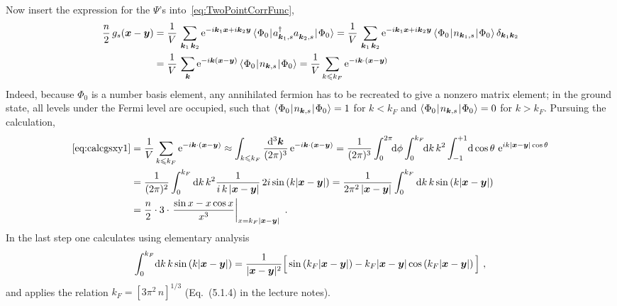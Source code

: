 \documentclass[11pt,a4paper]{article}
\newcommand{\ee}{{\mathrm{e}}}
\newcommand{\abs}[1]{\lvert#1\rvert}
\newcommand{\matrixel}[3]{\langle\hspace{0.15mm}#1\hspace{0.25mm}\vert\hspace{0.25mm} #2 \hspace{0.25mm}\vert\hspace{0.25mm}#3\hspace{0.15mm}\rangle}
\newcommand{\boldx}{{\boldsymbol x}}
\newcommand{\boldy}{{\boldsymbol y}}
\newcommand{\boldk}{{\boldsymbol k}}
\begin{document}
\begin{exenumerate}
\begin{loesung}
    Now insert the expression for the $\Psi$'s into~\eqref{eq:TwoPointCorrFunc},
    \begin{align}
      \frac{n}{2}\,g_s(\boldx-\boldy)
      &= \frac{1}{V}\,\sum_{\boldk_1\,\boldk_2} \ee^{-i\boldk_1\boldx + i\boldk_2\boldy} \,
      \matrixel{\Phi_0}{a^\dagger_{\boldk_1,s} a^{\vphantom{\dagger}}_{\boldk_2,s}}{\Phi_0}
      = \frac{1}{V}\,\sum_{\boldk_1\,\boldk_2} \ee^{-i\boldk_1\boldx + i\boldk_2\boldy} \,
      \matrixel{\Phi_0}{n_{\boldk_1,s}}{\Phi_0}\,\delta_{\boldk_1\boldk_2}\nonumber\\
      &= \frac{1}{V}\,\sum_{\boldk} \ee^{-i\boldk\left(\boldx-\boldy\right)} \,
      \matrixel{\Phi_0}{n_{\boldk,s}}{\Phi_0}
      = \frac{1}{V} \sum_{k\leqslant k_F} \ee^{-i\boldk\cdot\left(\boldx-\boldy\right)}
      \label{eq:calcgsxy1}
    \end{align}
    Indeed, because $\Phi_0$ is a number basis element, any annihilated fermion has to be recreated to give a nonzero
    matrix element; in the ground state, all levels under the Fermi level are occupied, such that
    $\matrixel{\Phi_0}{n_{\boldk,s}}{\Phi_0}=1$ for $k<k_F$ and $\matrixel{\Phi_0}{n_{\boldk,s}}{\Phi_0}=0$
    for $k>k_F$. Pursuing the calculation,
    \begin{align}
      \text{\eqref{eq:calcgsxy1}} &= \frac{1}{V} \sum_{k\leqslant k_F} \ee^{-i\boldk\cdot\left(\boldx-\boldy\right)}
      \approx
      \int_{k\leqslant k_F} \frac{\mathrm{d}^3\boldk}{(2\pi)^3}\,\ee^{-i\boldk\cdot\left(\boldx-\boldy\right)}
      = \frac{1}{(2\pi)^3} \int_0^{2\pi}\!\!\mathrm d\phi\int_0^{k_F}\!\! \mathrm d k\, k^2
      \int_{-1}^{+1}\! \mathrm d\cos\theta\,\,\ee^{i k \abs{\boldx-\boldy}\cos\theta} \nonumber\\
      &= \frac{1}{(2\pi)^2} \int_0^{k_F} \mathrm d k\,k^2 \frac1{i\,k\,\abs{\boldx-\boldy}}
      \,2i\sin\left(k\abs{\boldx-\boldy}\right)
      = \frac{1}{2\pi^2\,\abs{\boldx-\boldy}} \int_0^{k_F} \mathrm d k\,k \sin\left(k\abs{\boldx-\boldy}\right)
      \nonumber\\
      &= \frac{n}{2}\cdot 3\cdot \left.\frac{\sin x - x\cos x}{x^3}\right\rvert_{x=k_F\abs{\boldx-\boldy}}\ .
    \end{align}
    In the last step one calculates using elementary analysis
    \begin{align}
      \int_0^{k_F}\!\mathrm d k\,k\sin\left(k\abs{\boldx-\boldy}\right)
      = \frac{1}{\abs{\boldx-\boldy}^2}\Bigl[\,\sin\left(k_F \abs{\boldx-\boldy}\right)
        - k_F \abs{\boldx-\boldy} \cos\left(k_F\abs{\boldx-\boldy}\right) \,\Bigr]\ ,
    \end{align}
    and applies the relation $k_F=\left[3\pi^2\,n\right]^{1/3}$ (Eq.~(5.1.4) in the lecture notes).


\end{loesung}
\end{exenumerate}
\end{document}
